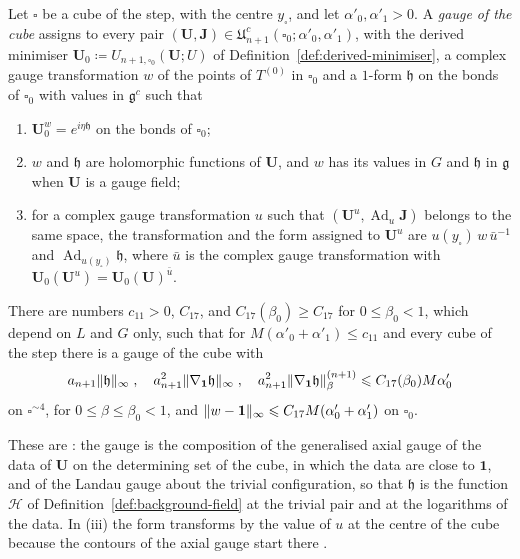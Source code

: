 \documentclass[11pt]{preprint}
\newcommand{\id}{\mathbf 1}
\newcommand{\Ad}{\operatorname{Ad}}
\DeclarePairedDelimiter{\norm}{\lVert}{\rVert}
\numberwithin{equation}{section}
\begin{document}
\begin{definition}\label{def:cube-gauge}
Let $\square$ be a cube of the step, with the centre $y_\square$, and let $\alpha'_0, \alpha'_1 > 0$. A \emph{gauge of the cube} assigns to every pair $(\mathbf U, \mathbf J) \in \mathfrak U^c_{n+1}(\square_0; \alpha'_0, \alpha'_1)$, with the derived minimiser $\mathbf U_0 \coloneqq U_{n+1,\square_0}(\mathbf U; U)$ of Definition~\ref{def:derived-minimiser}, a complex gauge transformation $w$ of the points of $T^{(0)}$ in $\square_0$ and a $1$-form $\mathfrak h$ on the bonds of $\square_0$ with values in $\mathfrak g^c$ such that
\begin{enumerate}[label=(\roman*)]
\item $\mathbf U_0^w = e^{i\eta\mathfrak h}$ on the bonds of $\square_0$;
\item $w$ and $\mathfrak h$ are holomorphic functions of $\mathbf U$, and $w$ has its values in $G$ and $\mathfrak h$ in $\mathfrak g$ when $\mathbf U$ is a gauge field;
\item for a complex gauge transformation $u$ such that $(\mathbf U^u, \Ad_u\mathbf J)$ belongs to the same space, the transformation and the form assigned to $\mathbf U^u$ are $u(y_\square)\,w\,\bar u^{-1}$ and $\Ad_{u(y_\square)}\mathfrak h$, where $\bar u$ is the complex gauge transformation with $\mathbf U_0(\mathbf U^u) = \mathbf U_0(\mathbf U)^{\bar u}$.
\end{enumerate}
\end{definition}

\begin{proposition}\label{prop:cube-gauge}
There are numbers $c_{11} > 0$, $C_{17}$, and $C_{17}(\beta_0) \geqslant C_{17}$ for $0 \leqslant \beta_0 < 1$, which depend on $L$ and $G$ only, such that for $M(\alpha'_0 + \alpha'_1) \leqslant c_{11}$ and every cube of the step there is a gauge of the cube with
\begin{equation}\label{eq:cube-gauge}
    a_{n+1}\norm{\mathfrak h}_\infty\;,\quad
    a_{n+1}^2\norm{\nabla_{\id}\mathfrak h}_\infty\;,\quad
    a_{n+1}^{2}\norm{\nabla_{\id}\mathfrak h}^{(n+1)}_\beta \leqslant C_{17}(\beta_0)M\alpha'_0
\end{equation}
on $\square^{\sim4}$, for $0 \leqslant \beta \leqslant \beta_0 < 1$, and $\norm{w - \id}_\infty \leqslant C_{17}M(\alpha'_0 + \alpha'_1)$ on $\square_0$.
\end{proposition}

These are \cite[(3.26), (3.27)]{BalabanRG1}: the gauge is the composition of the generalised axial gauge of the data of $\mathbf U$ on the determining set of the cube, in which the data are close to $\id$, and of the Landau gauge about the trivial configuration, so that $\mathfrak h$ is the function $\mathcal H$ of Definition~\ref{def:background-field} at the trivial pair and at the logarithms of the data. In (iii) the form transforms by the value of $u$ at the centre of the cube because the contours of the axial gauge start there \cite[p.~276]{BalabanRG1}.
\end{document}
